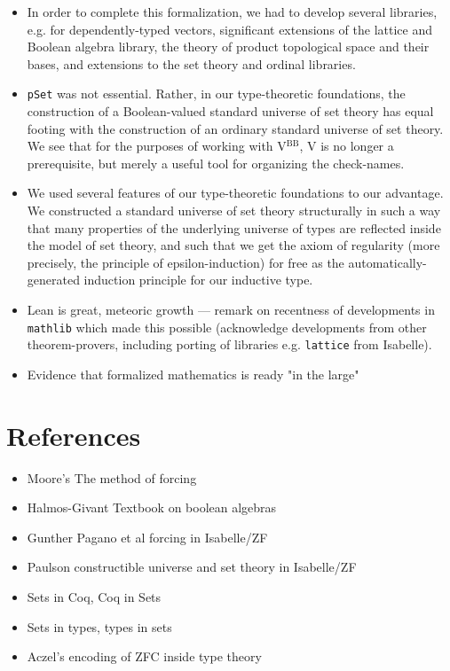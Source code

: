 \documentclass[a4paper,USenglish,cleveref, autoref]{lipics-v2019}
\begin{document}
\begin{itemize}
\item In order to complete this formalization, we had to develop several libraries, e.g. for dependently-typed vectors, significant extensions of the lattice and Boolean algebra library, the theory of product topological space and their bases, and extensions to the set theory and ordinal libraries.
  
\item \texttt{pSet} was not essential. Rather, in our type-theoretic foundations, the construction of a Boolean-valued standard universe of set theory has equal footing with the construction of an ordinary standard universe of set theory. We see that for the purposes of working with V\(^{\text{BB}}\), V is no longer a prerequisite, but merely a useful tool for organizing the check-names.
\item We used several features of our type-theoretic foundations to our advantage. We constructed a standard universe of set theory structurally in such a way that many properties of the underlying universe of types are reflected inside the model of set theory, and such that we get the axiom of regularity (more precisely, the principle of epsilon-induction) for free as the automatically-generated induction principle for our inductive type.
\item Lean is great, meteoric growth --- remark on recentness of developments in \texttt{mathlib} which made this possible (acknowledge developments from other theorem-provers, including porting of libraries e.g. \texttt{lattice} from Isabelle).
\item Evidence that formalized mathematics is ready "in the large"
\end{itemize}

\section{References}
\begin{itemize}
\item Moore's The method of forcing
\item Halmos-Givant Textbook on boolean algebras
\item Gunther Pagano et al forcing in Isabelle/ZF
\item Paulson constructible universe and set theory in Isabelle/ZF
\item Sets in Coq, Coq in Sets
\item Sets in types, types in sets
\item Aczel's encoding of ZFC inside type theory
\end{itemize}
\end{document}
